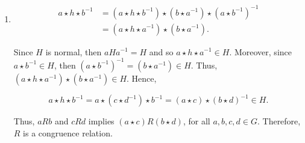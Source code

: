 \documentclass[12pt]{article}
\makeatletter
\theoremstyle{definition}
\theoremstyle{remark}
\renewenvironment{proof}[1][\proofname]{\par
  \pushQED{\qed}%
  \normalfont \topsep6\p@\@plus6\p@\relax
  \list{}{\leftmargin=0mm
          \rightmargin=4mm
          \settowidth{\itemindent}{\itshape#1}%
          \labelwidth=\itemindent
          \parsep=0pt \listparindent=\parindent 
  }
  \item[\hskip\labelsep
        \itshape
    #1\@addpunct{.}]\ignorespaces
}{%
  \popQED\endlist\@endpefalse
}
\let\oldproofname=\proofname
\renewcommand{\proofname}{\bf{\textit{\oldproofname}}}
\makeatother
\begin{document}
\begin{enumerate}[leftmargin=*]
\begin{enumerate}[label=(\alph*)]
\begin{proof}
                    \begin{equation*}
                        \begin{split}
                            a\star h\star b^{-1} &= (a\star h\star b^{-1})\star (b\star a^{-1})\star (a\star b^{-1})^{-1} \\
                            &= (a\star h\star a^{-1})\star (b\star a^{-1}).
                        \end{split}
                    \end{equation*}
                    
                    Since $H$ is normal, then $aHa^{-1}=H$ and so $a\star h\star a^{-1}\in H$. Moreover, since $a\star b^{-1}\in H$, then $(a\star b^{-1})^{-1}=(b\star a^{-1})\in H$. Thus, $(a\star h\star a^{-1})\star(b\star a^{-1})\in H$. Hence, 
                    
                    \begin{equation*}
                        a\star h\star b^{-1}=a\star(c\star d^{-1})\star b^{-1}=(a\star c)\star(b\star d)^{-1}\in H.
                    \end{equation*}
                    
                    Thus, $aRb$ and $cRd$ implies $(a\star c)R(b\star d)$, for all $a,b,c,d\in G$. Therefore, $R$ is a congruence relation.
                \end{proof}
        \end{enumerate}
        
\end{enumerate}
\end{document}
